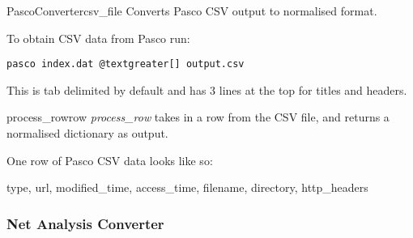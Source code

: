 \documentclass[letterpaper,10pt,english]{manual}
\begin{document}
\hypertarget{webscavator.converters.pasco.PascoConverter}{}\begin{classdesc}{PascoConverter}{csv\_file}
Converts Pasco CSV output to normalised format.

To obtain CSV data from Pasco run:

\begin{Verbatim}[commandchars=@\[\]]
pasco index.dat @textgreater[] output.csv
\end{Verbatim}

This is tab delimited by default and has 3 lines at the top for titles and headers.

\hypertarget{webscavator.converters.pasco.PascoConverter.process_row}{}\begin{methoddesc}{process\_row}{row}
\emph{process\_row} takes in a row from the CSV file, and returns a normalised dictionary as output.

One row of Pasco CSV data looks like so:

type, url, modified\_time, access\_time, filename, directory, http\_headers
\end{methoddesc}
\end{classdesc}

\resetcurrentobjects
\hypertarget{--doc-netanalysis}{}

\subsubsection{Net Analysis Converter}
\hypertarget{module-webscavator.converters.netanalysis}{}
\modulesynopsis{}
\end{document}
